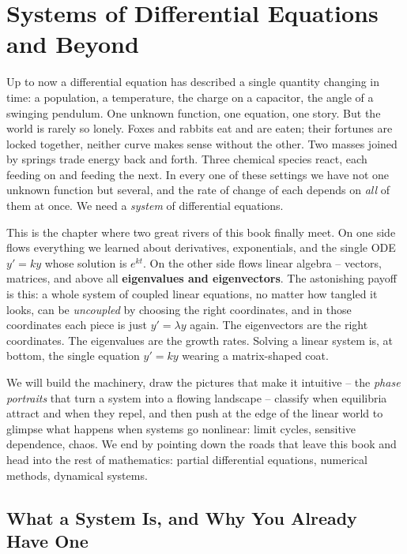 \chapter{Systems of Differential Equations and Beyond}

Up to now a differential equation has described a single quantity changing in
time: a population, a temperature, the charge on a capacitor, the angle of a
swinging pendulum. One unknown function, one equation, one story. But the world
is rarely so lonely. Foxes and rabbits eat and are eaten; their fortunes are
locked together, neither curve makes sense without the other. Two masses joined
by springs trade energy back and forth. Three chemical species react, each
feeding on and feeding the next. In every one of these settings we have not one
unknown function but several, and the rate of change of each depends on
\emph{all} of them at once. We need a \emph{system} of differential equations.

This is the chapter where two great rivers of this book finally meet. On one
side flows everything we learned about derivatives, exponentials, and the single
ODE $y' = ky$ whose solution is $e^{kt}$. On the other side flows linear
algebra -- vectors, matrices, and above all \textbf{eigenvalues and
eigenvectors}. The astonishing payoff is this: a whole system of coupled linear
equations, no matter how tangled it looks, can be \emph{uncoupled} by choosing
the right coordinates, and in those coordinates each piece is just $y'=\lambda y$
again. The eigenvectors are the right coordinates. The eigenvalues are the
growth rates. Solving a linear system is, at bottom, the single equation
$y'=ky$ wearing a matrix-shaped coat.

We will build the machinery, draw the pictures that make it intuitive -- the
\emph{phase portraits} that turn a system into a flowing landscape -- classify
when equilibria attract and when they repel, and then push at the edge of the
linear world to glimpse what happens when systems go nonlinear: limit cycles,
sensitive dependence, chaos. We end by pointing down the roads that leave
this book and head into the rest of mathematics: partial differential equations,
numerical methods, dynamical systems.

\chapterline

\section{What a System Is, and Why You Already Have One}
\label{ch39:what}

